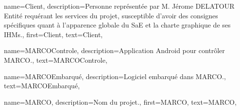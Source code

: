 {
    name={Client},
    description={Personne représentée par M. Jérome DELATOUR Entité requérant les services du projet, susceptible d'avoir des consignes
    spécifiques quant à l'apparence globale du SaE et la charte graphique de ses IHMs.},
    first={Client},
    text={Client},
}

{
    name={MARCOControle},
    description={Application Android pour contrôler MARCO.},
    text={MARCOControle},
}

{
    name={MARCOEmbarqué},
    description={Logiciel embarqué dans MARCO.},
    text={MARCOEmbarqué},
}

{
    name={MARCO},
    description={Nom du projet.},
    first={MARCO},
    text={MARCO},
}
